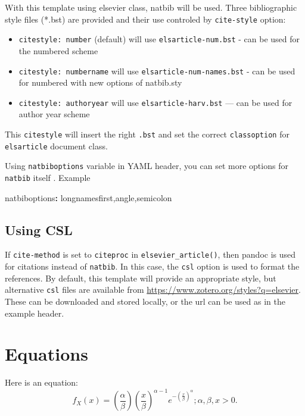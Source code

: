 \documentclass[
  authoryear,
  preprint]{elsarticle}
\newenvironment{Shaded}{\begin{snugshade}}{\end{snugshade}}
\newcommand{\AttributeTok}[1]{\textcolor[rgb]{0.40,0.45,0.13}{#1}}
\newcommand{\FunctionTok}[1]{\textcolor[rgb]{0.28,0.35,0.67}{#1}}
\newcommand{\KeywordTok}[1]{\textcolor[rgb]{0.00,0.23,0.31}{\textbf{#1}}}
\providecommand{\tightlist}{%
  \setlength{\itemsep}{0pt}\setlength{\parskip}{0pt}}\usepackage{longtable,booktabs,array}
\begin{document}
With this template using elsevier class, natbib will be used. Three
bibliographic style ﬁles (*.bst) are provided and their use controled by
\texttt{cite-style} option:

\begin{itemize}
\tightlist
\item
  \texttt{citestyle:\ number} (default) will use
  \texttt{elsarticle-num.bst} - can be used for the numbered scheme
\item
  \texttt{citestyle:\ numbername} will use
  \texttt{elsarticle-num-names.bst} - can be used for numbered with new
  options of natbib.sty
\item
  \texttt{citestyle:\ authoryear} will use \texttt{elsarticle-harv.bst}
  --- can be used for author year scheme
\end{itemize}

This \texttt{citestyle} will insert the right \texttt{.bst} and set the
correct \texttt{classoption} for \texttt{elsarticle} document class.

Using \texttt{natbiboptions} variable in YAML header, you can set more
options for \texttt{natbib} itself . Example

\begin{Shaded}
\begin{Highlighting}[]
\FunctionTok{natbiboptions}\KeywordTok{:}\AttributeTok{ longnamesfirst,angle,semicolon}
\end{Highlighting}
\end{Shaded}

\subsection{Using CSL}\label{using-csl}

If \texttt{cite-method} is set to \texttt{citeproc} in
\texttt{elsevier\_article()}, then pandoc is used for citations instead
of \texttt{natbib}. In this case, the \texttt{csl} option is used to
format the references. By default, this template will provide an
appropriate style, but alternative \texttt{csl} files are available from
\url{https://www.zotero.org/styles?q=elsevier}. These can be downloaded
and stored locally, or the url can be used as in the example header.

\section{Equations}\label{equations}

Here is an equation: \[ 
  f_{X}(x) = \left(\frac{\alpha}{\beta}\right)
  \left(\frac{x}{\beta}\right)^{\alpha-1}
  e^{-\left(\frac{x}{\beta}\right)^{\alpha}}; 
  \alpha,\beta,x > 0 .
\]
\end{document}

